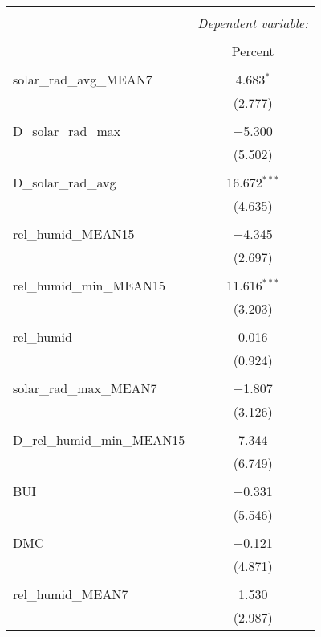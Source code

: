 
\begin{table}[!htbp] \centering 
  \caption{} 
  \label{} 
\begin{tabular}{@{\extracolsep{5pt}}lc} 
\\[-1.8ex]\hline 
\hline \\[-1.8ex] 
 & \multicolumn{1}{c}{\textit{Dependent variable:}} \\ 
\cline{2-2} 
\\[-1.8ex] & Percent \\ 
\hline \\[-1.8ex] 
 solar\_rad\_avg\_MEAN7 & 4.683$^{*}$ \\ 
  & (2.777) \\ 
  & \\ 
 D\_solar\_rad\_max & $-$5.300 \\ 
  & (5.502) \\ 
  & \\ 
 D\_solar\_rad\_avg & 16.672$^{***}$ \\ 
  & (4.635) \\ 
  & \\ 
 rel\_humid\_MEAN15 & $-$4.345 \\ 
  & (2.697) \\ 
  & \\ 
 rel\_humid\_min\_MEAN15 & 11.616$^{***}$ \\ 
  & (3.203) \\ 
  & \\ 
 rel\_humid & 0.016 \\ 
  & (0.924) \\ 
  & \\ 
 solar\_rad\_max\_MEAN7 & $-$1.807 \\ 
  & (3.126) \\ 
  & \\ 
 D\_rel\_humid\_min\_MEAN15 & 7.344 \\ 
  & (6.749) \\ 
  & \\ 
 BUI & $-$0.331 \\ 
  & (5.546) \\ 
  & \\ 
 DMC & $-$0.121 \\ 
  & (4.871) \\ 
  & \\ 
 rel\_humid\_MEAN7 & 1.530 \\ 
  & (2.987) \\ 

\end{tabular}
\end{table}
